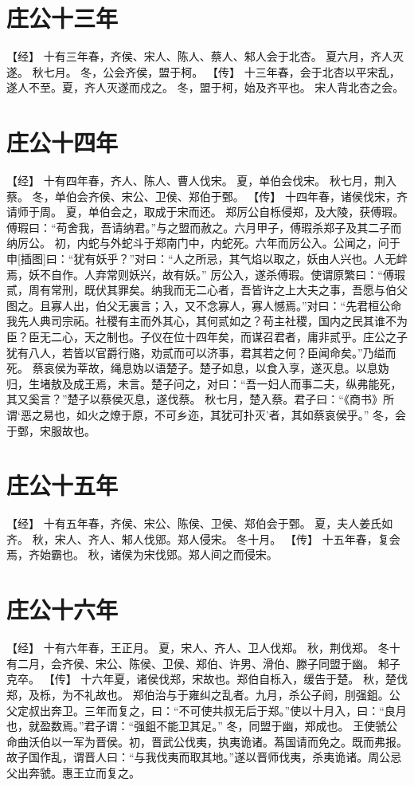 \documentclass[a4paper,12pt,UTF8,twoside]{ctexbook}
\begin{document}
\chapter{庄公十三年}

【经】
十有三年春，齐侯、宋人、陈人、蔡人、邾人会于北杏。
夏六月，齐人灭遂。
秋七月。
冬，公会齐侯，盟于柯。
【传】
十三年春，会于北杏以平宋乱，遂人不至。夏，齐人灭遂而戍之。
冬，盟于柯，始及齐平也。
宋人背北杏之会。

\chapter{庄公十四年}

【经】
十有四年春，齐人、陈人、曹人伐宋。
夏，单伯会伐宋。
秋七月，荆入蔡。
冬，单伯会齐侯、宋公、卫侯、郑伯于鄄。
【传】
十四年春，诸侯伐宋，齐请师于周。
夏，单伯会之，取成于宋而还。
郑厉公自栎侵郑，及大陵，获傅瑕。傅瑕曰：“苟舍我，吾请纳君。”与之盟而赦之。六月甲子，傅瑕杀郑子及其二子而纳厉公。
初，内蛇与外蛇斗于郑南门中，内蛇死。六年而厉公入。公闻之，问于申[插图]曰：“犹有妖乎？”对曰：“人之所忌，其气焰以取之，妖由人兴也。人无衅焉，妖不自作。人弃常则妖兴，故有妖。”
厉公入，遂杀傅瑕。使谓原繁曰：“傅瑕贰，周有常刑，既伏其罪矣。纳我而无二心者，吾皆许之上大夫之事，吾愿与伯父图之。且寡人出，伯父无裏言；入，又不念寡人，寡人憾焉。”对曰：“先君桓公命我先人典司宗祏。社稷有主而外其心，其何贰如之？苟主社稷，国内之民其谁不为臣？臣无二心，天之制也。子仪在位十四年矣，而谋召君者，庸非贰乎。庄公之子犹有八人，若皆以官爵行赂，劝贰而可以济事，君其若之何？臣闻命矣。”乃缢而死。
蔡哀侯为莘故，绳息妫以语楚子。楚子如息，以食入享，遂灭息。以息妫归，生堵敖及成王焉，未言。楚子问之，对曰：“吾一妇人而事二夫，纵弗能死，其又奚言？”楚子以蔡侯灭息，遂伐蔡。
秋七月，楚入蔡。君子曰：“《商书》所谓‘恶之易也，如火之燎于原，不可乡迩，其犹可扑灭’者，其如蔡哀侯乎。”
冬，会于鄄，宋服故也。

\chapter{庄公十五年}

【经】
十有五年春，齐侯、宋公、陈侯、卫侯、郑伯会于鄄。
夏，夫人姜氏如齐。
秋，宋人、齐人、邾人伐郳。郑人侵宋。
冬十月。
【传】
十五年春，复会焉，齐始霸也。
秋，诸侯为宋伐郳。郑人间之而侵宋。

\chapter{庄公十六年}

【经】
十有六年春，王正月。
夏，宋人、齐人、卫人伐郑。
秋，荆伐郑。
冬十有二月，会齐侯、宋公、陈侯、卫侯、郑伯、许男、滑伯、滕子同盟于幽。
邾子克卒。
【传】
十六年夏，诸侯伐郑，宋故也。郑伯自栎入，缓告于楚。
秋，楚伐郑，及栎，为不礼故也。
郑伯治与于雍纠之乱者。九月，杀公子阏，刖强鉏。公父定叔出奔卫。三年而复之，曰：“不可使共叔无后于郑。”使以十月入，曰：“良月也，就盈数焉。”君子谓：“强鉏不能卫其足。”
冬，同盟于幽，郑成也。
王使虢公命曲沃伯以一军为晋侯。初，晋武公伐夷，执夷诡诸。蒍国请而免之。既而弗报。故子国作乱，谓晋人曰：“与我伐夷而取其地。”遂以晋师伐夷，杀夷诡诸。周公忌父出奔虢。惠王立而复之。
\end{document}
